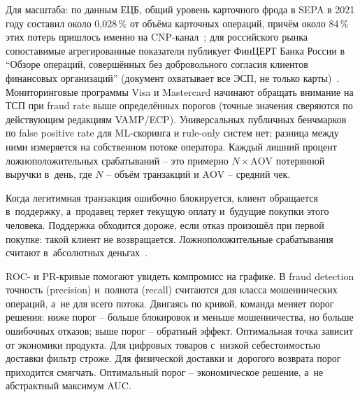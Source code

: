 Для масштаба: по данным ЕЦБ, общий уровень карточного фрода
в SEPA в 2021 году составил около 0,028\,\% от объёма
карточных операций, причём около 84\,\% этих потерь пришлось
именно на CNP-канал~\cite{ecb-card-fraud-2021}; для
российского рынка сопоставимые агрегированные показатели
публикует ФинЦЕРТ Банка России в \enquote{Обзоре операций,
совершённых без добровольного согласия клиентов финансовых
организаций} (документ охватывает все ЭСП, не только
карты)~\cite{cbr-fincert-fraud-overview}.
Мониторинговые программы Visa и Mastercard начинают обращать
внимание на ТСП при fraud rate выше определённых порогов
(точные значения сверяются по действующим редакциям VAMP/ECP).
Универсальных публичных бенчмарков по false positive rate
для ML-скоринга и rule-only систем нет; разница между ними
измеряется на собственном потоке оператора. Каждый лишний
процент ложноположительных срабатываний -- это примерно
$N \times \mathrm{AOV}$ потерянной выручки в~день, где
$N$ -- объём транзакций и $\mathrm{AOV}$ -- средний чек.

Когда легитимная транзакция ошибочно блокируется, клиент обращается
в~поддержку, а~продавец теряет текущую оплату и~будущие покупки этого
человека. Поддержка обходится дороже, если отказ произошёл при первой
покупке: такой клиент не возвращается. Ложноположительные
срабатывания считают в~абсолютных
деньгах~\cite{visa-auth-management-2020}.

ROC- и PR-кривые помогают увидеть компромисс на графике. В fraud
detection точность (precision) и~полнота (recall) считаются для
класса мошеннических операций, а~не для всего потока. Двигаясь по
кривой, команда меняет порог решения: ниже порог -- больше блокировок
и меньше мошенничества, но больше ошибочных отказов; выше порог --
обратный эффект. Оптимальная точка зависит от экономики продукта.
Для цифровых товаров с~низкой себестоимостью доставки фильтр строже.
Для физической доставки и~дорогого возврата порог приходится смягчать.
Оптимальный порог -- экономическое решение, а~не абстрактный максимум
AUC.

